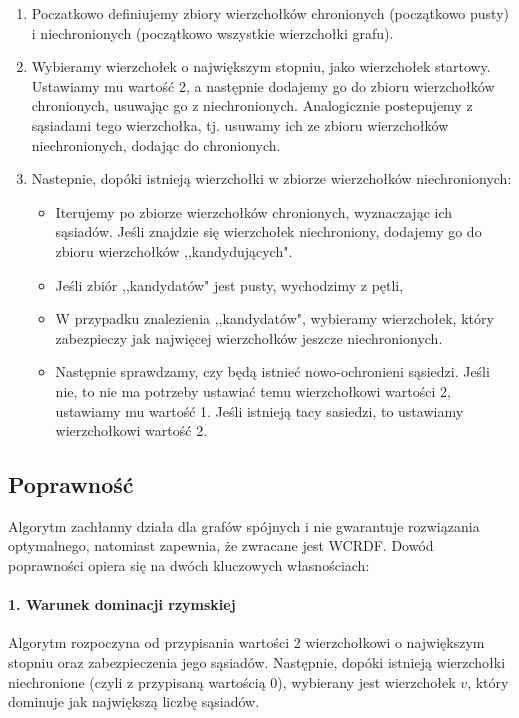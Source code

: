     \begin{enumerate}
        \item Poczatkowo definiujemy zbiory wierzchołków chronionych (początkowo pusty) i niechronionych (początkowo wszystkie wierzchołki grafu).
        \item Wybieramy wierzchołek o największym stopniu, jako wierzchołek startowy. Ustawiamy mu wartość 2, a następnie dodajemy go do zbioru wierzchołków chronionych, usuwając go z niechronionych. Analogicznie postepujemy z sąsiadami tego wierzchołka, tj. usuwamy ich ze zbioru wierzchołków niechronionych, dodając do chronionych. 
        \item Nastepnie, dopóki istnieją wierzchołki w zbiorze wierzchołków niechronionych:
        \begin{itemize}
            \item Iterujemy po zbiorze wierzchołków chronionych, wyznaczając ich sąsiadów. Jeśli znajdzie się wierzchołek niechroniony, dodajemy go do zbioru wierzchołków ,,kandydujących".
            \item Jeśli zbiór ,,kandydatów" jest pusty, wychodzimy z pętli,
            \item W przypadku znalezienia ,,kandydatów", wybieramy wierzchołek, który zabezpieczy jak najwięcej wierzchołków jeszcze niechronionych.
            \item Następnie sprawdzamy, czy będą istnieć nowo-ochronieni sąsiedzi. Jeśli nie, to nie ma potrzeby ustawiać temu wierzchołkowi wartości 2, ustawiamy mu wartość 1. Jeśli istnieją tacy sasiedzi, to ustawiamy wierzchołkowi wartość 2. 
        \end{itemize}
    \end{enumerate}

    \subsection{Poprawność}

    Algorytm zachłanny działa dla grafów spójnych i nie gwarantuje rozwiązania optymalnego, natomiast zapewnia, że zwracane jest WCRDF. Dowód poprawności opiera się na dwóch kluczowych własnościach:

    \paragraph{1. Warunek dominacji rzymskiej}

    Algorytm rozpoczyna od przypisania wartości 2 wierzchołkowi o największym stopniu oraz zabezpieczenia jego sąsiadów. Następnie, dopóki istnieją wierzchołki niechronione (czyli z przypisaną wartością 0), wybierany jest wierzchołek $v$, który dominuje jak największą liczbę sąsiadów.

